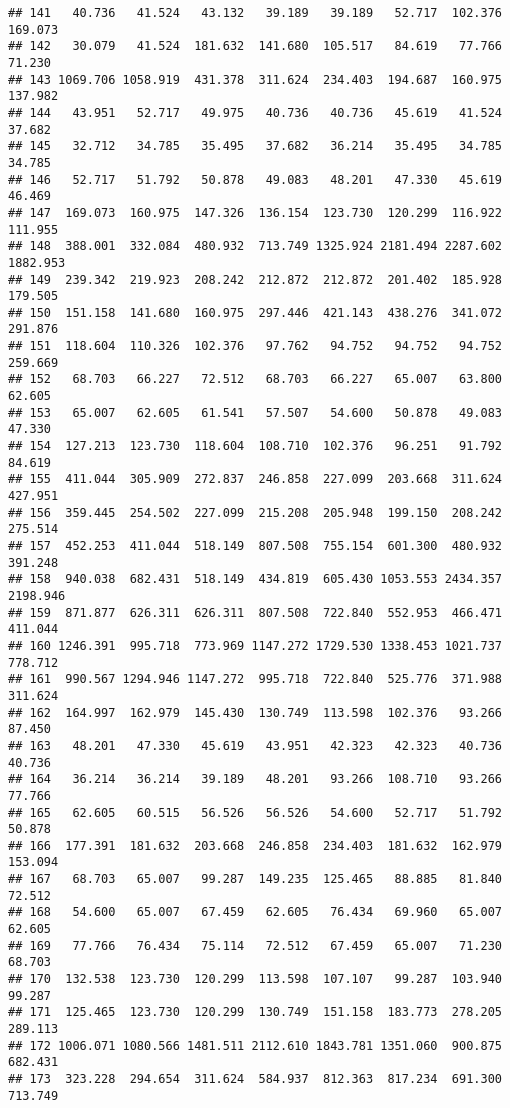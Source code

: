 \documentclass[
]{article}
\begin{document}
\begin{verbatim}
## 141   40.736   41.524   43.132   39.189   39.189   52.717  102.376  169.073
## 142   30.079   41.524  181.632  141.680  105.517   84.619   77.766   71.230
## 143 1069.706 1058.919  431.378  311.624  234.403  194.687  160.975  137.982
## 144   43.951   52.717   49.975   40.736   40.736   45.619   41.524   37.682
## 145   32.712   34.785   35.495   37.682   36.214   35.495   34.785   34.785
## 146   52.717   51.792   50.878   49.083   48.201   47.330   45.619   46.469
## 147  169.073  160.975  147.326  136.154  123.730  120.299  116.922  111.955
## 148  388.001  332.084  480.932  713.749 1325.924 2181.494 2287.602 1882.953
## 149  239.342  219.923  208.242  212.872  212.872  201.402  185.928  179.505
## 150  151.158  141.680  160.975  297.446  421.143  438.276  341.072  291.876
## 151  118.604  110.326  102.376   97.762   94.752   94.752   94.752  259.669
## 152   68.703   66.227   72.512   68.703   66.227   65.007   63.800   62.605
## 153   65.007   62.605   61.541   57.507   54.600   50.878   49.083   47.330
## 154  127.213  123.730  118.604  108.710  102.376   96.251   91.792   84.619
## 155  411.044  305.909  272.837  246.858  227.099  203.668  311.624  427.951
## 156  359.445  254.502  227.099  215.208  205.948  199.150  208.242  275.514
## 157  452.253  411.044  518.149  807.508  755.154  601.300  480.932  391.248
## 158  940.038  682.431  518.149  434.819  605.430 1053.553 2434.357 2198.946
## 159  871.877  626.311  626.311  807.508  722.840  552.953  466.471  411.044
## 160 1246.391  995.718  773.969 1147.272 1729.530 1338.453 1021.737  778.712
## 161  990.567 1294.946 1147.272  995.718  722.840  525.776  371.988  311.624
## 162  164.997  162.979  145.430  130.749  113.598  102.376   93.266   87.450
## 163   48.201   47.330   45.619   43.951   42.323   42.323   40.736   40.736
## 164   36.214   36.214   39.189   48.201   93.266  108.710   93.266   77.766
## 165   62.605   60.515   56.526   56.526   54.600   52.717   51.792   50.878
## 166  177.391  181.632  203.668  246.858  234.403  181.632  162.979  153.094
## 167   68.703   65.007   99.287  149.235  125.465   88.885   81.840   72.512
## 168   54.600   65.007   67.459   62.605   76.434   69.960   65.007   62.605
## 169   77.766   76.434   75.114   72.512   67.459   65.007   71.230   68.703
## 170  132.538  123.730  120.299  113.598  107.107   99.287  103.940   99.287
## 171  125.465  123.730  120.299  130.749  151.158  183.773  278.205  289.113
## 172 1006.071 1080.566 1481.511 2112.610 1843.781 1351.060  900.875  682.431
## 173  323.228  294.654  311.624  584.937  812.363  817.234  691.300  713.749

\end{verbatim}
\end{document}
